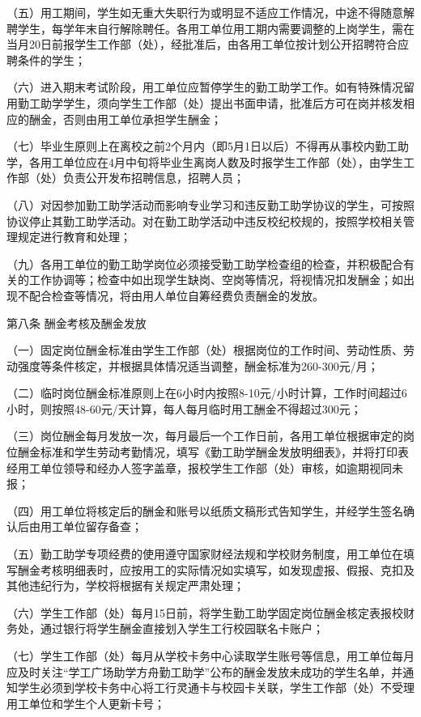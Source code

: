 \documentclass[UTF8,12pt,a4paper]{report}
\begin{document}
（五）用工期间，学生如无重大失职行为或明显不适应工作情况，中途不得随意解聘学生，每学年末自行解除聘任。各用工单位用工期内需要调整的上岗学生，需在当月20日前报学生工作部（处），经批准后，由各用工单位按计划公开招聘符合应聘条件的学生；

（六）进入期末考试阶段，用工单位应暂停学生的勤工助学工作。如有特殊情况留用勤工助学学生，须向学生工作部（处）提出书面申请，批准后方可在岗并核发相应的酬金，否则由用工单位承担学生酬金；

（七）毕业生原则上在离校之前2个月内（即5月1日以后）不得再从事校内勤工助学，各用工单位应在4月中旬将毕业生离岗人数及时报学生工作部（处），由学生工作部（处）负责公开发布招聘信息，招聘人员；

（八）对因参加勤工助学活动而影响专业学习和违反勤工助学协议的学生，可按照协议停止其勤工助学活动。对在勤工助学活动中违反校纪校规的，按照学校相关管理规定进行教育和处理；

（九）各用工单位的勤工助学岗位必须接受勤工助学检查组的检查，并积极配合有关的工作协调等；检查中如出现学生缺岗、空岗等情况，将视情况扣发酬金；如出现不配合检查等情况，将由用人单位自筹经费负责酬金的发放。

第八条 酬金考核及酬金发放

（一）固定岗位酬金标准由学生工作部（处）根据岗位的工作时间、劳动性质、劳动强度等条件核定，并根据具体情况适当调整，酬金标准为260-300元/月；

（二）临时岗位酬金标准原则上在6小时内按照8-10元/小时计算，工作时间超过6小时，则按照48-60元/天计算，每人每月临时用工酬金不得超过300元；

（三）岗位酬金每月发放一次，每月最后一个工作日前，各用工单位根据审定的岗位酬金标准和学生劳动考勤情况，填写《勤工助学酬金发放明细表》，并将打印表经用工单位领导和经办人签字盖章，报校学生工作部（处）审核，如逾期视同未报；

（四）用工单位将核定后的酬金和账号以纸质文稿形式告知学生，并经学生签名确认后由用工单位留存备查；

（五）勤工助学专项经费的使用遵守国家财经法规和学校财务制度，用工单位在填写酬金考核明细表时，应按用工的实际情况如实填写，如发现虚报、假报、克扣及其他违纪行为，学校将根据有关规定严肃处理；

（六）学生工作部（处）每月15日前，将学生勤工助学固定岗位酬金核定表报校财务处，通过银行将学生酬金直接划入学生工行校园联名卡账户；

（七）学生工作部（处）每月从学校卡务中心读取学生账号等信息，用工单位每月应及时关注“学工广场助学方舟勤工助学”公布的酬金发放未成功的学生名单，并通知学生必须到学校卡务中心将工行灵通卡与校园卡关联，学生工作部（处）不受理用工单位和学生个人更新卡号；
\end{document}
